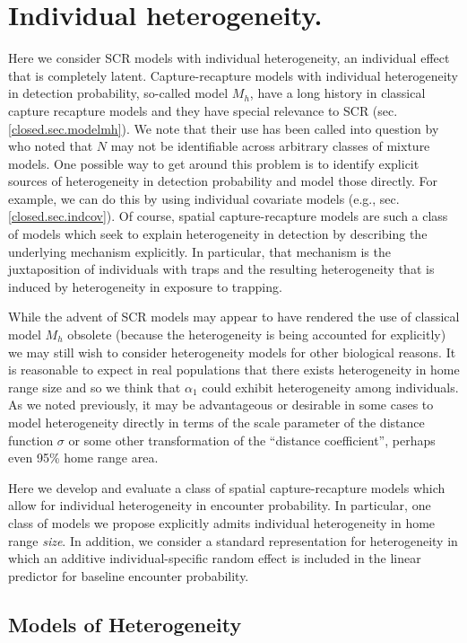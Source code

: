 \section{Individual heterogeneity.}

Here we consider SCR models with individual heterogeneity, an
individual effect that is
completely latent.  Capture-recapture models with individual
heterogeneity in detection probability, so-called model $M_{h}$, have
a long history in classical capture recapture models and they have
special relevance to SCR (sec. \ref{closed.sec.modelmh}).
We note that their use has been called into question by
\citet{link:2003} who noted that $N$ may not be identifiable across
arbitrary classes of mixture models.  One possible way to get around
this problem is to identify explicit sources of heterogeneity in
detection probability and model those directly. For example, we can do
this by using individual covariate models (e.g.,
sec. \ref{closed.sec.indcov}). Of course, spatial capture-recapture
models are such a class of models which seek to explain heterogeneity
in detection by describing the underlying mechanism explicitly. In
particular, that mechanism is the juxtaposition of individuals with
traps and the resulting heterogeneity that is induced by heterogeneity
in exposure to trapping.

While the advent of SCR models may appear to have rendered the use of
classical model $M_h$ obsolete (because the heterogeneity is being
accounted for explicitly) we may still wish to consider
heterogeneity models for other biological reasons.
It is reasonable
to expect in real populations that there exists
heterogeneity in home range size and so we think that $\alpha_{1}$
could exhibit heterogeneity among individuals.  As we noted
previously, it may be advantageous or desirable in some cases to model
heterogeneity directly in terms of the scale parameter of the distance
function $\sigma$ or
some other transformation of the ``distance coefficient'', perhaps
even 95\% home range area.

Here we develop and evaluate a class of spatial capture-recapture
models which allow for individual heterogeneity in encounter
probability.  In particular, one class of models we propose explicitly
admits individual heterogeneity in home range {\it size}. In addition,
we consider a standard representation for heterogeneity in which an
additive individual-specific random effect is included in the linear
predictor for baseline encounter probability.  

\subsection{Models of Heterogeneity}
\label{covariates.sec.heterogeneity}

